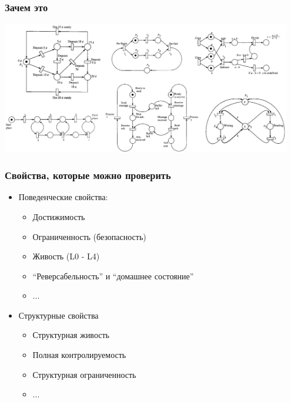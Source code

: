 \documentclass{../mcsslides}
\begin{document}
    \begin{frame}
        \frametitle{Зачем это}
        \begin{center}
            \includegraphics[width=0.95\textwidth]{petriNetExamples.png}
        \end{center}
    \end{frame}

    \begin{frame}
        \frametitle{Свойства, которые можно проверить}
        \begin{itemize}
            \item Поведенческие свойства:
            \begin{itemize}
                \item Достижимость
                \item Ограниченность (безопасность)
                \item Живость (L0 - L4)
                \item ``Реверсабельность'' и ``домашнее состояние''
                \item ...
            \end{itemize}
            \item Структурные свойства
            \begin{itemize}
                \item Структурная живость
                \item Полная контролируемость
                \item Структурная ограниченность
                \item ...
            \end{itemize}
        \end{itemize}
    \end{frame}
\end{document}

